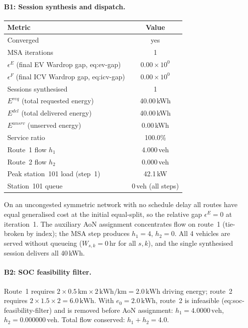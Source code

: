 \paragraph{B1: Session synthesis and dispatch.}
\begin{center}
\begin{tabular}{lc}
\toprule
Metric & Value \\
\midrule
Converged            & yes \\
MSA iterations       & 1 \\
$\epsilon^E$ (final EV Wardrop gap, eq:ev-gap) & $0.00 \times 10^{0}$ \\
$\epsilon^F$ (final ICV Wardrop gap, eq:icv-gap) & $0.00 \times 10^{0}$ \\
Sessions synthesised & 1 \\
$E^{req}$ (total requested energy) & 40.00\,kWh \\
$E^{del}$ (total delivered energy) & 40.00\,kWh \\
$E^{unsrv}$ (unserved energy) & 0.00\,kWh \\
Service ratio        & 100.0\% \\
Route~1 flow $h_1$   & 4.000\,veh \\
Route~2 flow $h_2$   & 0.000\,veh \\
Peak station~101 load (step~1) & 42.1\,kW \\
Station~101 queue    & 0\,veh (all steps) \\
\bottomrule
\end{tabular}
\end{center}
On an uncongested symmetric network with no schedule delay all routes
have equal generalised cost at the initial equal-split, so the
relative gap $\epsilon^E = 0$ at iteration~1.  The auxiliary AoN
assignment concentrates flow on route~1 (tie-broken by index); the MSA
step produces $h_1 = 4$, $h_2 = 0$.  All 4 vehicles are served without
queueing ($W_{s,k}=0$\,hr for all $s,k$), and the single synthesised
session delivers all 40\,kWh.

\paragraph{B2: SOC feasibility filter.}
Route~1 requires $2\times0.5\,\text{km}\times2\,\text{kWh/km}=2.0\,\text{kWh}$
driving energy; route~2 requires $2\times1.5\times2=6.0\,\text{kWh}$.
With $e_0=2.0\,\text{kWh}$, route~2 is infeasible
(eq:soc-feasibility-filter) and is removed before AoN assignment:
$h_1 = 4.0000\,\text{veh}$, $h_2 = 0.000000\,\text{veh}$.
Total flow conserved: $h_1 + h_2 = 4.0$.

